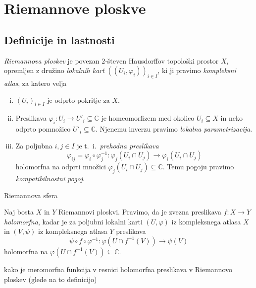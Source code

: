 \documentclass[mat1]{fmfdelo}
\newcommand{\C}{\mathbb C}
\newcommand{\inv}{^{-1}}
\newcommand{\ti}{t.~i.\ }
\theoremstyle{definition}
\begin{document}
\section{Riemannove ploskve} \label{riemannove ploskve}
\subsection{Definicije in lastnosti}


\begin{definicija}
    \emph{Riemannova ploskev} je povezan $2$-števen Hausdorffov topološki prostor $X$, opremljen z družino \emph{lokalnih kart} $((U_i, \varphi_i))_{i \in I}$, ki ji pravimo \emph{kompleksni atlas}, za katero velja
    \begin{enumerate}[(i)]
        \item $(U_i)_{i \in I}$ je odprto pokritje za $X$.
        \item Preslikava $\varphi_i : U_i \to U'_i \subseteq \C$ je homeomorfizem med okolico $U_i \subseteq X$ in neko odprto pomnožico $U'_i \subseteq \C$. Njenemu inverzu pravimo \emph{lokalna parametrizacija}.
        \item Za poljubna $i,j \in I$ je \ti \emph{prehodna preslikava}
        \[
            \varphi_{ij} = \varphi_i \circ \varphi_j\inv : \varphi_j(U_i \cap U_j) \to \varphi_i(U_i \cap U_j)   
        \]
        holomorfna na odprti množici $\varphi_j(U_i \cap U_j) \subseteq \C$. Temu pogoju pravimo \emph{kompatibilnostni pogoj}.
    \end{enumerate}
\end{definicija}

\begin{zgled*}
    Riemannova sfera
\end{zgled*}

\begin{definicija}
    Naj bosta $X$ in $Y$ Riemannovi ploskvi. Pravimo, da je zvezna preslikava $f:X \to Y$ \emph{holomorfna}, kadar je za poljubni lokalni karti $(U, \varphi)$ iz kompleksnega atlasa $X$ in $(V, \psi)$ iz kompleksnega atlasa $Y$ preslikava
    \[
        \psi \circ f \circ \varphi\inv : \varphi(U \cap f\inv(V)) \to \psi(V)
    \]
    holomorfna na $\varphi(U \cap f\inv(V)) \subseteq \C$.
\end{definicija}

\begin{zgled*}
    kako je meromorfna funkcija v resnici holomorfna preslikava v Riemannovo ploskev (glede na to definicijo)
\end{zgled*}
\end{document}
